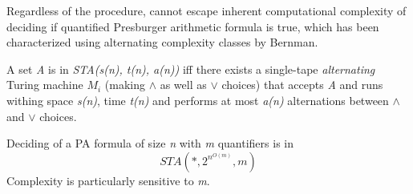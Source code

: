\documentclass[11pt]{article}
\begin{document}
Regardless of the procedure, cannot escape inherent computational complexity of deciding if quantified Presburger arithmetic formula is true, which has been characterized using alternating complexity classes by Bernman. 

A set \textit{A} is in \textit{STA(s(n), t(n), a(n))} iff there exists a single-tape \textit{alternating} Turing machine $M_i$ (making $\land$ as well as $\lor$ choices) that accepts \textit{A} and runs withing space \textit{s(n)}, time \textit{t(n)} and performs at most \textit{a(n)} alternations between $\land$ and $\lor$ choices. 

Deciding of a PA formula of size \textit{n} with \textit{m} quantifiers is in $$STA(*, 2^{n^{O(m)}}, m)$$ Complexity is particularly sensitive to \textit{m}. 
\end{document}
